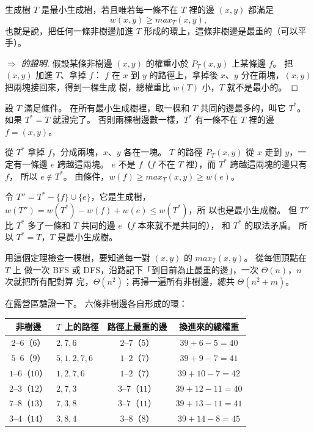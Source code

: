 \begin{theorem}
\label{thm:mst-check}
生成樹 $T$ 是最小生成樹，若且唯若每一條不在 $T$ 裡的邊 $(x, y)$ 都滿足
\[
w(x, y) \ge \mathit{max}_T(x, y),
\]
也就是說，把任何一條非樹邊加進 $T$ 形成的環上，這條非樹邊是最重的（可以平手）。
\end{theorem}

\begin{proof}[$\Rightarrow$ 的證明]
假設某條非樹邊 $(x, y)$ 的權重小於 $P_T(x, y)$ 上某條邊 $f$。 把 $(x, y)$ 加進 $T$、拿掉 $f$：
$f$ 在 $x$ 到 $y$ 的路徑上，拿掉後 $x$、$y$ 分在兩塊，$(x, y)$ 把兩塊接回來，得到一棵生成
樹，總權重比 $w(T)$ 小，$T$ 就不是最小的。
\end{proof}

\begin{whybox}
設 $T$ 滿足條件。 在所有最小生成樹裡，取一棵和 $T$ 共同的邊最多的，叫它 $T^*$。 如果 $T^* =
T$ 就證完了。 否則兩棵樹邊數一樣，$T^*$ 有一條不在 $T$ 裡的邊 $f = (x, y)$。

從 $T^*$ 拿掉 $f$，分成兩塊，$x$、$y$ 各在一塊。 $T$ 的路徑 $P_T(x, y)$ 從 $x$ 走到 $y$，一
定有一條邊 $e$ 跨越這兩塊。 $e$ 不是 $f$（$f$ 不在 $T$ 裡），而 $T^*$ 跨越這兩塊的邊只有 $f$，
所以 $e \notin T^*$。 由條件，$w(f) \ge \mathit{max}_T(x, y) \ge w(e)$。

令 $T'' = T^* - \{f\} \cup \{e\}$，它是生成樹，$w(T'') = w(T^*) - w(f) + w(e) \le w(T^*)$，所
以也是最小生成樹。 但 $T''$ 比 $T^*$ 多了一條和 $T$ 共同的邊 $e$（$f$ 本來就不是共同的），
和 $T^*$ 的取法矛盾。 所以 $T^* = T$，$T$ 是最小生成樹。
\end{whybox}

用這個定理檢查一棵樹，要知道每一對 $(x, y)$ 的 $\mathit{max}_T(x, y)$。 從每個頂點在 $T$ 上
做一次 BFS 或 DFS，沿路記下「到目前為止最重的邊」，一次 $\Theta(n)$，$n$ 次就把所有配對算
完，$\Theta(n^2)$；再掃一遍所有非樹邊，總共 $\Theta(n^2 + m)$。

在露營區驗證一下。 六條非樹邊各自形成的環：

\begin{center}
\small
\begin{tabular}{clcc}
\toprule
非樹邊 & $T$ 上的路徑 & 路徑上最重的邊 & 換進來的總權重 \\
\midrule
$2$--$6$（$6$） & $2, 7, 6$ & $2$--$7$（$5$） & $39 + 6 - 5 = 40$ \\
$5$--$6$（$9$） & $5, 1, 2, 7, 6$ & $1$--$2$（$7$） & $39 + 9 - 7 = 41$ \\
$1$--$6$（$10$） & $1, 2, 7, 6$ & $1$--$2$（$7$） & $39 + 10 - 7 = 42$ \\
$2$--$3$（$12$） & $2, 7, 3$ & $3$--$7$（$11$） & $39 + 12 - 11 = 40$ \\
$7$--$8$（$13$） & $7, 3, 8$ & $3$--$7$（$11$） & $39 + 13 - 11 = 41$ \\
$3$--$4$（$14$） & $3, 8, 4$ & $3$--$8$（$8$） & $39 + 14 - 8 = 45$ \\
\bottomrule
\end{tabular}
\end{center}

